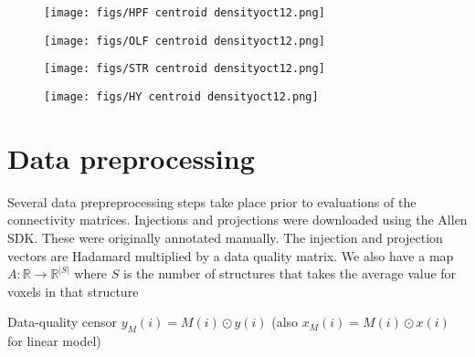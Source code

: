 \begin{figure}[H]
    \centering
    \texttt{[image: figs/HPF centroid densityoct12.png]} 
    \label{fig:my_label}
\end{figure}
\newpage

\begin{figure}[H]
    \centering
    \texttt{[image: figs/OLF centroid densityoct12.png]} 
    \label{fig:my_label}
\end{figure}
\newpage

\begin{figure}[H]
    \centering
    \texttt{[image: figs/STR centroid densityoct12.png]} 
    \label{fig:my_label}
\end{figure}
\newpage

\begin{figure}[H]
    \centering
    \texttt{[image: figs/HY centroid densityoct12.png]} 
    \label{fig:my_label}
\end{figure}

\newpage


\section{Data preprocessing}




\label{sec:dp}

Several data prepreprocessing steps take place prior to evaluations of the connectivity matrices.
Injections and projections were downloaded using the Allen SDK.
These were originally annotated manually.
The injection and projection vectors are Hadamard multiplied by a data quality matrix. We also have a map $A: \mathbb R \to \mathbb R^{|S|}$ where $S$ is the number of structures that takes the average value for voxels in that structure

\begin{algorithmic}
\State Data-quality censor $y_M (i) = M(i) \odot y(i)$ (also $x_M(i) = M(i) \odot x(i)$ for linear model)
\end{algorithmic}

